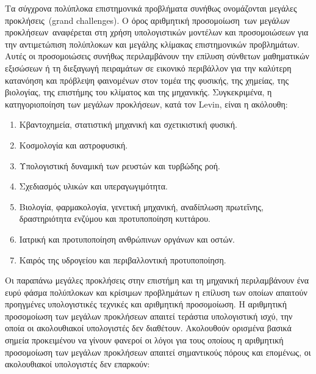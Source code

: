 \documentclass[12pt,a4paper]{article} %
\begin{document}
Τα σύγχρονα πολύπλοκα επιστημονικά προβλήματα συνήθως ονομάζονται
\guillemotleft μεγάλες προκλήσεις\guillemotright\ (grand challenges). 
Ο όρος \guillemotleft αριθμητική προσομοίωση\guillemotright\ των
\guillemotleft μεγάλων προκλήσεων\guillemotright\ αναφέρεται στη χρήση υπολογιστικών μοντέλων και 
προσομοιώσεων για την αντιμετώπιση πολύπλοκων και μεγάλης κλίμακας 
επιστημονικών προβλημάτων. Αυτές οι προσομοιώσεις συνήθως περιλαμβάνουν
την επίλυση σύνθετων μαθηματικών εξισώσεων ή τη διεξαγωγή πειραμάτων 
σε εικονικό περιβάλλον για την καλύτερη κατανόηση και πρόβλεψη 
φαινομένων στον τομέα της φυσικής, της χημείας, της βιολογίας, 
της επιστήμης του κλίματος και της μηχανικής. Συγκεκριμένα, η 
κατηγοριοποίηση των μεγάλων προκλήσεων, κατά τον Levin, 
είναι η ακόλουθη:

\begin{enumerate} [font=\bfseries]
    \item {Κβαντοχημεία, στατιστική μηχανική και σχετικιστική φυσική.}
    \item {Κοσμολογία και αστροφυσική.}
    \item {Υπολογιστική δυναμική των ρευστών και τυρβώδης ροή.}
    \item {Σχεδιασμός υλικών και υπεραγωγιμότητα.}
    \item {Βιολογία, φαρμακολογία, γενετική μηχανική, αναδίπλωση πρωτεΐνης,
    δραστηριότητα ενζύμου και προτυποποίηση κυττάρου.}
    \item {Ιατρική και προτυποποίηση ανθρώπινων οργάνων και οστών.}
    \item {Καιρός της υδρογείου και περιβαλλοντική προτυποποίηση.}
\end{enumerate}

\begin{sloppypar}
Οι παραπάνω μεγάλες προκλήσεις στην επιστήμη και τη μηχανική περιλαμβάνουν
ένα ευρύ φάσμα πολύπλοκων και κρίσιμων προβλημάτων η επίλυση των οποίων
απαιτούν προηγμένες υπολογιστικές τεχνικές και αριθμητική προσομοίωση.
Η αριθμητική προσομοίωση των μεγάλων προκλήσεων απαιτεί τεράστια υπολογιστική
ισχύ, την οποία οι ακολουθιακοί υπολογιστές δεν διαθέτουν. Ακολουθούν ορισμένα
βασικά σημεία προκειμένου να γίνουν φανεροί οι λόγοι για τους οποίους η αριθμητική
προσομοίωση των μεγάλων προκλήσεων απαιτεί σημαντικούς πόρους και επομένως,
οι ακολουθιακοί υπολογιστές δεν επαρκούν: \end{sloppypar}
\end{document}
